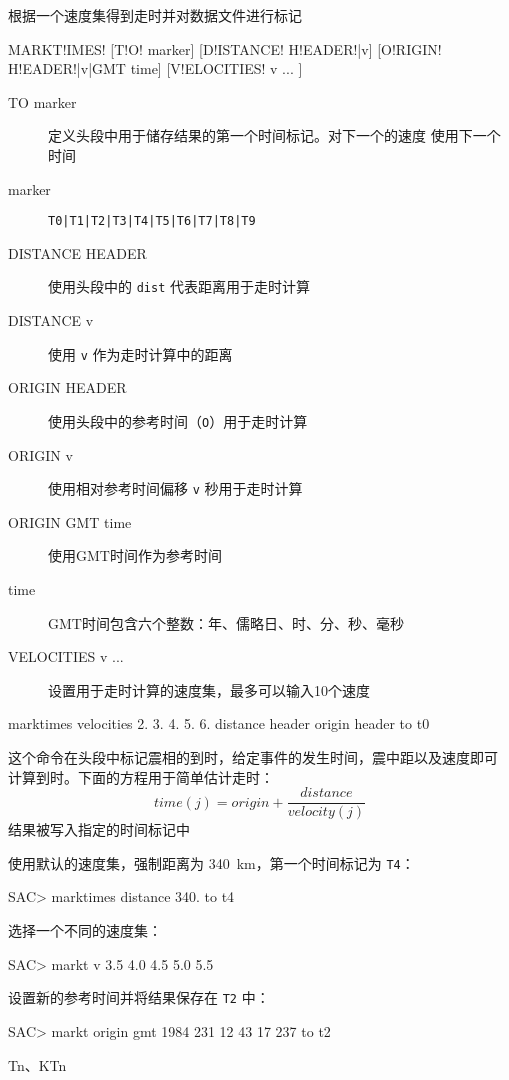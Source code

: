 \label{cmd:marktimes}

根据一个速度集得到走时并对数据文件进行标记

\begin{SACSTX}
MARKT!IMES! [T!O! marker] [D!ISTANCE! H!EADER!|v] [O!RIGIN! H!EADER!|v|GMT time]
    [V!ELOCITIES! v ... ]
\end{SACSTX}

\begin{description}
\item [TO marker] 定义头段中用于储存结果的第一个时间标记。对下一个的速度
    使用下一个时间
\item [marker] \texttt{T0|T1|T2|T3|T4|T5|T6|T7|T8|T9}
\item [DISTANCE HEADER] 使用头段中的 \texttt{dist} 代表距离用于走时计算
\item [DISTANCE v] 使用 \texttt{v} 作为走时计算中的距离
\item [ORIGIN HEADER] 使用头段中的参考时间（\texttt{O}）用于走时计算
\item [ORIGIN v] 使用相对参考时间偏移 \texttt{v} 秒用于走时计算
\item [ORIGIN GMT time] 使用GMT时间作为参考时间
\item [time] GMT时间包含六个整数：年、儒略日、时、分、秒、毫秒
\item [VELOCITIES v ...] 设置用于走时计算的速度集，最多可以输入10个速度
\end{description}

\begin{SACDFT}
marktimes velocities 2. 3. 4. 5. 6. distance header origin header to t0
\end{SACDFT}

这个命令在头段中标记震相的到时，给定事件的发生时间，震中距以及速度即可
计算到时。下面的方程用于简单估计走时：
 		\[ time(j) = origin + \frac{distance}{velocity(j)} \]
结果被写入指定的时间标记中

使用默认的速度集，强制距离为 \SI{340}{\km}，第一个时间标记为 \texttt{T4}：
\begin{SACCode}
SAC> marktimes distance 340. to t4
\end{SACCode}

选择一个不同的速度集：
\begin{SACCode}
SAC> markt v 3.5 4.0 4.5 5.0 5.5
\end{SACCode}

设置新的参考时间并将结果保存在 \texttt{T2} 中：
\begin{SACCode}
SAC> markt origin gmt 1984 231 12 43 17 237 to t2
\end{SACCode}

Tn、KTn
